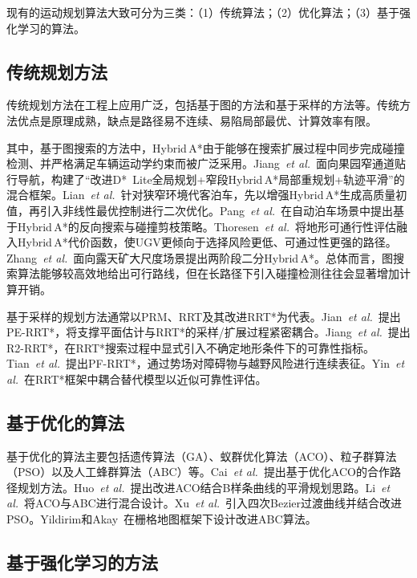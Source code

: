 \documentclass[conference]{IEEEtran}
\newcommand{\etal}{\textit{et al.}}
\begin{document}
现有的运动规划算法大致可分为三类：（1）传统算法；（2）优化算法；（3）基于强化学习的算法。

\subsection{传统规划方法}

传统规划方法在工程上应用广泛，包括基于图的方法和基于采样的方法等。传统方法优点是原理成熟，缺点是路径易不连续、易陷局部最优、计算效率有限。

其中，基于图搜索的方法中，Hybrid\,A*由于能够在搜索扩展过程中同步完成碰撞检测、并严格满足车辆运动学约束而被广泛采用。Jiang~\etal~\cite{jiang2025hybrid}面向果园窄通道贴行导航，构建了``改进D*~Lite全局规划+窄段Hybrid\,A*局部重规划+轨迹平滑''的混合框架。Lian~\etal~\cite{lian2023trajectory}针对狭窄环境代客泊车，先以增强Hybrid\,A*生成高质量初值，再引入非线性最优控制进行二次优化。Pang~\etal~\cite{pang2022curvature}在自动泊车场景中提出基于Hybrid\,A*的反向搜索与碰撞剪枝策略。Thoresen~\etal~\cite{thoresen2021path}将地形可通行性评估融入Hybrid\,A*代价函数，使UGV更倾向于选择风险更低、可通过性更强的路径。Zhang~\etal~\cite{zhang2024twostage}面向露天矿大尺度场景提出两阶段二分Hybrid\,A*。总体而言，图搜索算法能够较高效地给出可行路线，但在长路径下引入碰撞检测往往会显著增加计算开销。

基于采样的规划方法通常以PRM、RRT及其改进RRT*为代表。Jian~\etal~\cite{jian2024path}提出PE-RRT*，将支撑平面估计与RRT*的采样/扩展过程紧密耦合。Jiang~\etal~\cite{jiang2022r2rrt}提出R2-RRT*，在RRT*搜索过程中显式引入不确定地形条件下的可靠性指标。Tian~\etal~\cite{tian2023driving}提出PF-RRT*，通过势场对障碍物与越野风险进行连续表征。Yin~\etal~\cite{yin2023efficient}在RRT*框架中耦合替代模型以近似可靠性评估。

\subsection{基于优化的算法}

基于优化的算法主要包括遗传算法（GA）、蚁群优化算法（ACO）、粒子群算法（PSO）以及人工蜂群算法（ABC）等。Cai~\etal~\cite{cai2024cooperative}提出基于优化ACO的合作路径规划方法。Huo~\etal~\cite{huo2024smooth}提出改进ACO结合B样条曲线的平滑规划思路。Li~\etal~\cite{li2023mixing}将ACO与ABC进行混合设计。Xu~\etal~\cite{xu2022quartic}引入四次Bezier过渡曲线并结合改进PSO。Yildirim和Akay~\cite{yildirim2025efficient}在栅格地图框架下设计改进ABC算法。

\subsection{基于强化学习的方法}
\end{document}
